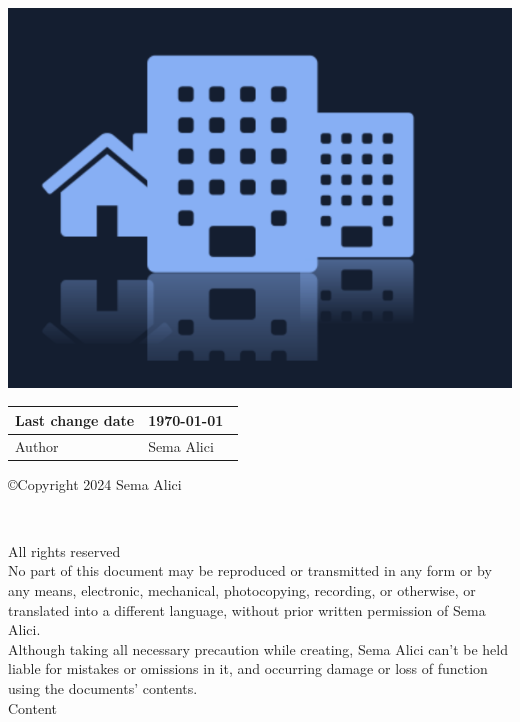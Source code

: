 \documentclass[a4paper,titlepage]{article} %
\title{\mytitle}
\author{Sema Alici}
\makeatletter
\renewcommand\tableofcontents{%
    \@starttoc{toc}%
}
\makeatother
\begin{document}
\begin{titlingpage}
  \centerline{\includegraphics[width=21.59cm]{Header.png}}
  \vspace{4cm}
  \Huge
  \thetitle

  \vspace{1cm}
  \large
  
\begin{tabularx}{\textwidth}{ X X }
  \hline
  Last change date & \today\ \\ \hline
  Author & Sema Alici \\ \hline
\end{tabularx}  

\end{titlingpage}





\newpage
\begin{Huge}
\copyright \space Copyright 2024 Sema Alici
\end{Huge} \\
\vspace{1cm}

All rights reserved \\

No part of this document may be reproduced or transmitted in any form or by any means, electronic, mechanical, photocopying, recording, or otherwise, or translated into a different language, without prior written permission of Sema Alici. \\

Although taking all necessary precaution while creating, Sema Alici can’t be held liable for mistakes or omissions in it, and occurring damage or loss of function using the documents’ contents. \\



\newpage
\Huge
Content

\large
\tableofcontents

\vspace*{1cm}

\large
\listoffigures


\newpage


\end{document}
